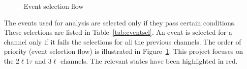 \documentclass[letterpaper,12pt]{article}
\begin{document}
\begin{figure}
\caption{Event selection flow}
\label{fig:eventselflow}
\end{figure}

The events used for analysis are selected only if they pass certain conditions. These selections are listed in Table~\ref{tab:eventsel}. An event is selected for a channel only if it fails the selections for all the previous channels. The order of priority (event selection flow) is illustrated in Figure~\ref{fig:eventselflow}. This project focuses on the 2$\ell$1$\tau$ and 3$\ell$ channels. The relevant states have been highlighted in red.
\end{document}
